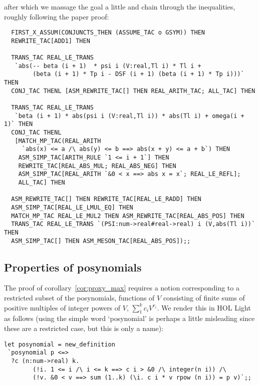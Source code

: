\documentclass[10pt]{article}
\theoremstyle{definition}
\theoremstyle{remark}
\numberwithin{equation}{section}
\begin{document}
\noindent after which we massage the goal a little and chain through the
inequalities, roughly following the paper proof:

\begin{scriptsize}\begin{verbatim}
  FIRST_X_ASSUM(CONJUNCTS_THEN (ASSUME_TAC o GSYM)) THEN
  REWRITE_TAC[ADD1] THEN

  TRANS_TAC REAL_LE_TRANS
   `abs(-- beta (i + 1)  * psi i (V:real,Tl i) * Tl i +
        (beta (i + 1) * Tp i - DSF (i + 1) (beta (i + 1) * Tp i)))` THEN
  CONJ_TAC THENL [ASM_REWRITE_TAC[] THEN REAL_ARITH_TAC; ALL_TAC] THEN

  TRANS_TAC REAL_LE_TRANS
   `beta (i + 1) * abs(psi i (V:real,Tl i)) * abs(Tl i) + omega(i + 1)` THEN
  CONJ_TAC THENL
   [MATCH_MP_TAC(REAL_ARITH
     `abs(x) <= a /\ abs(y) <= b ==> abs(x + y) <= a + b`) THEN
    ASM_SIMP_TAC[ARITH_RULE `1 <= i + 1`] THEN
    REWRITE_TAC[REAL_ABS_MUL; REAL_ABS_NEG] THEN
    ASM_SIMP_TAC[REAL_ARITH `&0 < x ==> abs x = x`; REAL_LE_REFL];
    ALL_TAC] THEN

  ASM_REWRITE_TAC[] THEN REWRITE_TAC[REAL_LE_RADD] THEN
  ASM_SIMP_TAC[REAL_LE_LMUL_EQ] THEN
  MATCH_MP_TAC REAL_LE_MUL2 THEN ASM_REWRITE_TAC[REAL_ABS_POS] THEN
  TRANS_TAC REAL_LE_TRANS `(PSI:num->real#real->real) i (V,abs(Tl i))` THEN
  ASM_SIMP_TAC[] THEN ASM_MESON_TAC[REAL_ABS_POS]);;
\end{verbatim}\end{scriptsize}

\subsection{Properties of posynomials}

The proof of corollary~\ref{cor:proxy_max} requires a notion corresponding to a restricted subset of the
posynomials, functions of $V$ consisting of finite sums of positive multiples
of integer powers of $V$, $\sum_1^k c_i V^{r_i}$. We render this in HOL Light
as follows (using the simple word `posynomial' is perhaps a little misleading
since these are a restricted case, but this is only a name):

\begin{scriptsize}\begin{verbatim}
let posynomial = new_definition
 `posynomial p <=>
  ?c (n:num->real) k.
        (!i. 1 <= i /\ i <= k ==> c i > &0 /\ integer(n i)) /\
        (!v. &0 < v ==> sum (1..k) (\i. c i * v rpow (n i)) = p v)`;;
\end{verbatim}\end{scriptsize}
\end{document}
